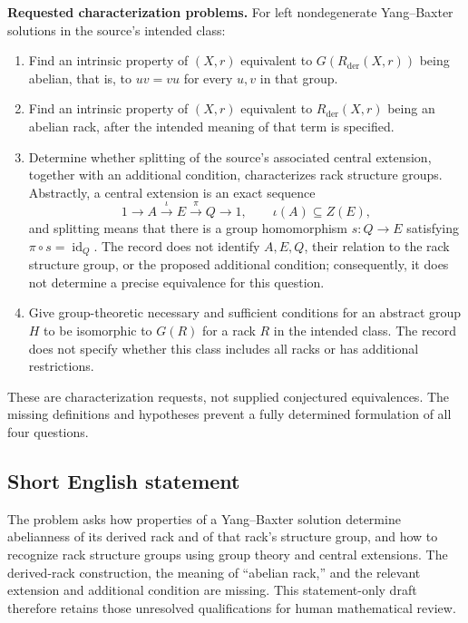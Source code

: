 \documentclass[11pt]{article}
\begin{document}
\textbf{Requested characterization problems.} For left nondegenerate Yang--Baxter solutions in the source's intended class:
\begin{enumerate}
\item Find an intrinsic property of \((X,r)\) equivalent to \(G(R_{\mathrm{der}}(X,r))\) being abelian, that is, to \(uv=vu\) for every \(u,v\) in that group.
\item Find an intrinsic property of \((X,r)\) equivalent to \(R_{\mathrm{der}}(X,r)\) being an abelian rack, after the intended meaning of that term is specified.
\item Determine whether splitting of the source's associated central extension, together with an additional condition, characterizes rack structure groups. Abstractly, a central extension is an exact sequence
\[
1\longrightarrow A\xrightarrow{\iota}E\xrightarrow{\pi}Q\longrightarrow1,
\qquad \iota(A)\subseteq Z(E),
\]
and splitting means that there is a group homomorphism \(s\colon Q\to E\) satisfying \(\pi\circ s=\operatorname{id}_Q\). The record does not identify \(A,E,Q\), their relation to the rack structure group, or the proposed additional condition; consequently, it does not determine a precise equivalence for this question.
\item Give group-theoretic necessary and sufficient conditions for an abstract group \(H\) to be isomorphic to \(G(R)\) for a rack \(R\) in the intended class. The record does not specify whether this class includes all racks or has additional restrictions.
\end{enumerate}
These are characterization requests, not supplied conjectured equivalences. The missing definitions and hypotheses prevent a fully determined formulation of all four questions.
\subsection{Short English statement}
The problem asks how properties of a Yang--Baxter solution determine abelianness of its derived rack and of that rack's structure group, and how to recognize rack structure groups using group theory and central extensions. The derived-rack construction, the meaning of ``abelian rack,'' and the relevant extension and additional condition are missing. This statement-only draft therefore retains those unresolved qualifications for human mathematical review.
\end{document}
